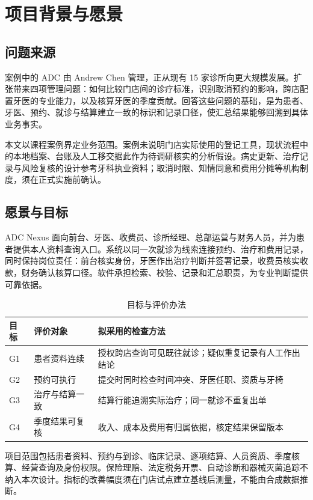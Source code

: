 \documentclass[12pt,a4paper,fontset=windows]{ctexart}
\begin{document}
\section{项目背景与愿景}
\subsection{问题来源}
案例中的 ADC 由 Andrew Chen 管理，正从现有 15 家诊所向更大规模发展。扩张带来四项管理问题：如何比较门店间的诊疗标准，识别取消预约的影响，跨店配置牙医的专业能力，以及核算牙医的季度贡献\cite{case}。回答这些问题的基础，是为患者、牙医、预约、就诊与结算建立一致的标识和记录口径，使汇总结果能够回溯到具体业务事实。

本文以课程案例界定业务范围。案例未说明门店实际使用的登记工具，现状流程中的本地档案、台账及人工移交据此作为待调研核实的分析假设。病史更新、治疗记录与风险复核的设计参考牙科执业资料\cite{ada-history,ada-records}；取消时限、知情同意和费用分摊等机构制度，须在正式实施前确认。

\subsection{愿景与目标}
ADC Nexus 面向前台、牙医、收费员、诊所经理、总部运营与财务人员，并为患者提供本人资料查询入口。系统以同一次就诊为线索连接预约、治疗和费用记录，同时保持岗位责任：前台核实身份，牙医作出治疗判断并签署记录，收费员核实收款，财务确认核算口径。软件承担检索、校验、记录和汇总职责，为专业判断提供可靠依据。

\begin{table}[!htbp]\centering\small
\caption{目标与评价办法}\label{tab:goals}
\begin{tabular}{@{}L{17mm}L{54mm}L{73mm}@{}}\toprule
目标 & 评价对象 & 拟采用的检查方法\\\midrule
G1 & 患者资料连续 & 授权跨店查询可见既往就诊；疑似重复记录有人工作出结论\\
G2 & 预约可执行 & 提交时同时检查时间冲突、牙医任职、资质与牙椅\\
G3 & 治疗与结算一致 & 结算行能追溯实际治疗；同一就诊不重复出单\\
G4 & 季度结果可复核 & 收入、成本及费用有归属依据，核定结果保留版本\\
\bottomrule\end{tabular}\end{table}

项目范围包括患者资料、预约与到诊、临床记录、逐项结算、人员资质、季度核算、经营查询及身份权限。保险理赔、法定税务开票、自动诊断和器械灭菌追踪不纳入本次设计。指标的改善幅度须在门店试点建立基线后测量，不能由合成数据推断。
\end{document}

